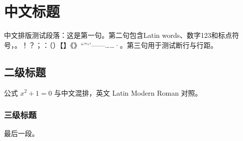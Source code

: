 \documentclass[a4paper,10pt]{article}
\begin{document}
\section{中文标题}
中文排版测试段落：这是第一句。第二句包含Latin words、数字123和标点符号，。！？；：（）【】《》“”‘’——……·。第三句用于测试断行与行距。
\subsection{二级标题}
公式 $x^2+1=0$ 与中文混排，英文 Latin Modern Roman 对照。
\subsubsection{三级标题}
最后一段。
\end{document}
